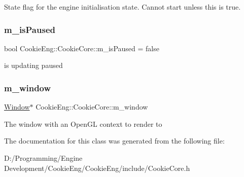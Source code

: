 State flag for the engine initialisation state. Cannot start unless this is true. \mbox{\label{class_cookie_eng_1_1_cookie_core_ab2ee013f3abf0fae40a416aac7b942d0}} 
\subsubsection{\texorpdfstring{m\+\_\+is\+Paused}{m\_isPaused}}
{\footnotesize\ttfamily bool Cookie\+Eng\+::\+Cookie\+Core\+::m\+\_\+is\+Paused = false\hspace{0.3cm}{\ttfamily [protected]}}

is updating paused \mbox{\label{class_cookie_eng_1_1_cookie_core_ab95ee714d9d00c4a43859d0e427ea577}} 
\subsubsection{\texorpdfstring{m\+\_\+window}{m\_window}}
{\footnotesize\ttfamily \hyperlink{class_cookie_eng_1_1_window}{Window}$\ast$ Cookie\+Eng\+::\+Cookie\+Core\+::m\+\_\+window\hspace{0.3cm}{\ttfamily [protected]}}

The window with an Open\+GL context to render to 

The documentation for this class was generated from the following file\+:\begin{DoxyCompactItemize}
\item 
D\+:/\+Programming/\+Engine Development/\+Cookie\+Eng/\+Cookie\+Eng/include/Cookie\+Core.\+h\end{DoxyCompactItemize}
